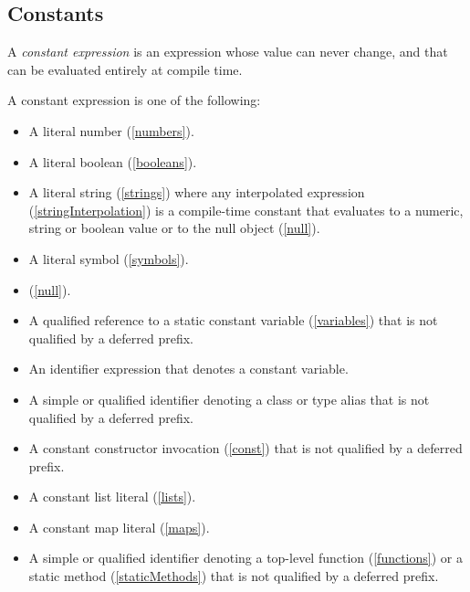 \documentclass{article}
\begin{document}
\subsection{Constants}

\LMHash{}
A {\em constant expression} is an expression whose value can never change, and that can be evaluated entirely at compile time.

\LMHash{}
A constant expression is one of the following:
\begin{itemize}
\item A literal number (\ref{numbers}).
\item A literal boolean (\ref{booleans}).
\item A literal string (\ref{strings}) where any interpolated expression (\ref{stringInterpolation}) is a compile-time constant that evaluates to a numeric, string or boolean value or to the null object (\ref{null}).
\item A literal symbol (\ref{symbols}).
\item \NULL{} (\ref{null}).
\item A qualified reference to a static constant variable (\ref{variables}) that is not qualified by a deferred prefix.
\item An identifier expression that denotes a constant variable.
\item A simple or qualified identifier denoting a class or type alias that is not qualified by a deferred prefix.
\item A constant constructor invocation (\ref{const}) that is not qualified by a deferred prefix.
\item A constant list literal (\ref{lists}).
\item A constant map literal (\ref{maps}).
\item A simple or qualified identifier denoting a top-level function (\ref{functions}) or a static method (\ref{staticMethods}) that is not qualified by a deferred prefix.

\end{itemize}
\end{document}
